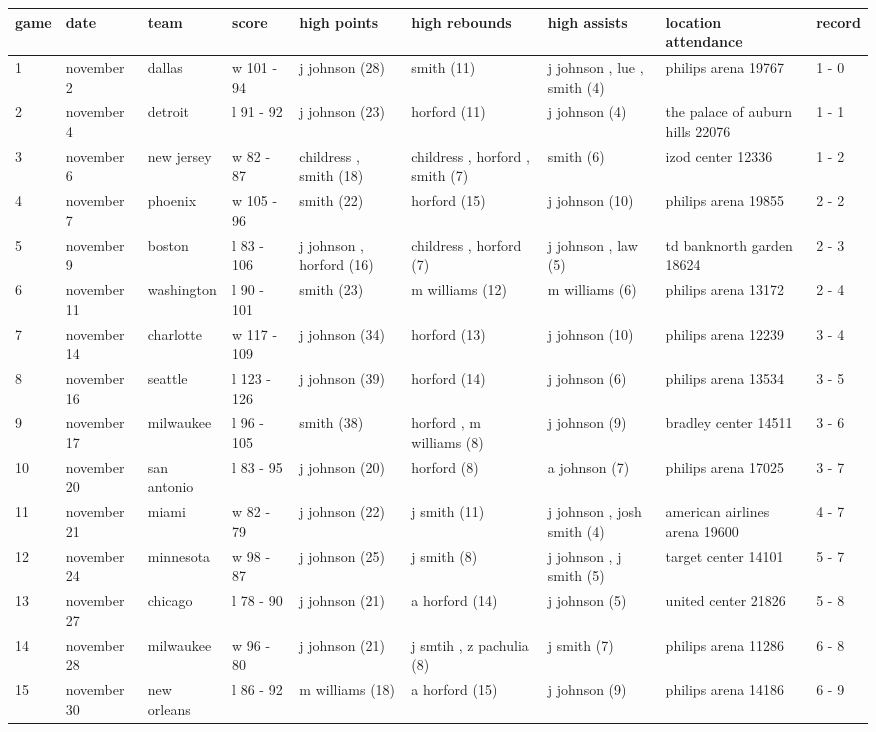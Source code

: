 \documentclass{article}
\begin{document}
\begin{tabular}{lllllllll}
\toprule
game & date & team & score & high points & high rebounds & high assists & location attendance & record \\
\midrule
1 & november 2 & dallas & w 101 - 94 & j johnson (28) & smith (11) & j johnson , lue , smith (4) & philips arena 19767 & 1 - 0 \\
2 & november 4 & detroit & l 91 - 92 & j johnson (23) & horford (11) & j johnson (4) & the palace of auburn hills 22076 & 1 - 1 \\
3 & november 6 & new jersey & w 82 - 87 & childress , smith (18) & childress , horford , smith (7) & smith (6) & izod center 12336 & 1 - 2 \\
4 & november 7 & phoenix & w 105 - 96 & smith (22) & horford (15) & j johnson (10) & philips arena 19855 & 2 - 2 \\
5 & november 9 & boston & l 83 - 106 & j johnson , horford (16) & childress , horford (7) & j johnson , law (5) & td banknorth garden 18624 & 2 - 3 \\
6 & november 11 & washington & l 90 - 101 & smith (23) & m williams (12) & m williams (6) & philips arena 13172 & 2 - 4 \\
7 & november 14 & charlotte & w 117 - 109 & j johnson (34) & horford (13) & j johnson (10) & philips arena 12239 & 3 - 4 \\
8 & november 16 & seattle & l 123 - 126 & j johnson (39) & horford (14) & j johnson (6) & philips arena 13534 & 3 - 5 \\
9 & november 17 & milwaukee & l 96 - 105 & smith (38) & horford , m williams (8) & j johnson (9) & bradley center 14511 & 3 - 6 \\
10 & november 20 & san antonio & l 83 - 95 & j johnson (20) & horford (8) & a johnson (7) & philips arena 17025 & 3 - 7 \\
11 & november 21 & miami & w 82 - 79 & j johnson (22) & j smith (11) & j johnson , josh smith (4) & american airlines arena 19600 & 4 - 7 \\
12 & november 24 & minnesota & w 98 - 87 & j johnson (25) & j smith (8) & j johnson , j smith (5) & target center 14101 & 5 - 7 \\
13 & november 27 & chicago & l 78 - 90 & j johnson (21) & a horford (14) & j johnson (5) & united center 21826 & 5 - 8 \\
14 & november 28 & milwaukee & w 96 - 80 & j johnson (21) & j smtih , z pachulia (8) & j smith (7) & philips arena 11286 & 6 - 8 \\
15 & november 30 & new orleans & l 86 - 92 & m williams (18) & a horford (15) & j johnson (9) & philips arena 14186 & 6 - 9 \\
\bottomrule
\end{tabular}
\end{document}

